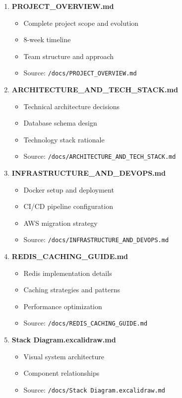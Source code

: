 \documentclass[12pt,a4paper]{article}
\begin{document}
\begin{enumerate}
    \item \textbf{PROJECT\_OVERVIEW.md}
    \begin{itemize}
        \item Complete project scope and evolution
        \item 8-week timeline
        \item Team structure and approach
        \item Source: \texttt{/docs/PROJECT\_OVERVIEW.md}
    \end{itemize}

    \item \textbf{ARCHITECTURE\_AND\_TECH\_STACK.md}
    \begin{itemize}
        \item Technical architecture decisions
        \item Database schema design
        \item Technology stack rationale
        \item Source: \texttt{/docs/ARCHITECTURE\_AND\_TECH\_STACK.md}
    \end{itemize}

    \item \textbf{INFRASTRUCTURE\_AND\_DEVOPS.md}
    \begin{itemize}
        \item Docker setup and deployment
        \item CI/CD pipeline configuration
        \item AWS migration strategy
        \item Source: \texttt{/docs/INFRASTRUCTURE\_AND\_DEVOPS.md}
    \end{itemize}

    \item \textbf{REDIS\_CACHING\_GUIDE.md}
    \begin{itemize}
        \item Redis implementation details
        \item Caching strategies and patterns
        \item Performance optimization
        \item Source: \texttt{/docs/REDIS\_CACHING\_GUIDE.md}
    \end{itemize}

    \item \textbf{Stack Diagram.excalidraw.md}
    \begin{itemize}
        \item Visual system architecture
        \item Component relationships
        \item Source: \texttt{/docs/Stack Diagram.excalidraw.md}
    \end{itemize}
\end{enumerate}
\end{document}

